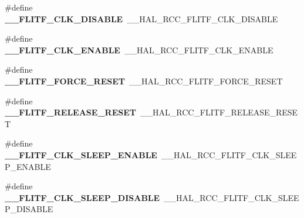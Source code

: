 \begin{DoxyCompactItemize}
\item 
\#define {\bfseries \+\_\+\+\_\+\+F\+L\+I\+T\+F\+\_\+\+C\+L\+K\+\_\+\+D\+I\+S\+A\+B\+LE}~\+\_\+\+\_\+\+H\+A\+L\+\_\+\+R\+C\+C\+\_\+\+F\+L\+I\+T\+F\+\_\+\+C\+L\+K\+\_\+\+D\+I\+S\+A\+B\+LE\hypertarget{group___h_a_l___r_c_c___aliased_ga12f4502b35811f253e6a23d42a048b82}{}\label{group___h_a_l___r_c_c___aliased_ga12f4502b35811f253e6a23d42a048b82}

\item 
\#define {\bfseries \+\_\+\+\_\+\+F\+L\+I\+T\+F\+\_\+\+C\+L\+K\+\_\+\+E\+N\+A\+B\+LE}~\+\_\+\+\_\+\+H\+A\+L\+\_\+\+R\+C\+C\+\_\+\+F\+L\+I\+T\+F\+\_\+\+C\+L\+K\+\_\+\+E\+N\+A\+B\+LE\hypertarget{group___h_a_l___r_c_c___aliased_ga18ea2573c2441635fb10ae66bd5babf2}{}\label{group___h_a_l___r_c_c___aliased_ga18ea2573c2441635fb10ae66bd5babf2}

\item 
\#define {\bfseries \+\_\+\+\_\+\+F\+L\+I\+T\+F\+\_\+\+F\+O\+R\+C\+E\+\_\+\+R\+E\+S\+ET}~\+\_\+\+\_\+\+H\+A\+L\+\_\+\+R\+C\+C\+\_\+\+F\+L\+I\+T\+F\+\_\+\+F\+O\+R\+C\+E\+\_\+\+R\+E\+S\+ET\hypertarget{group___h_a_l___r_c_c___aliased_gaabbf02ca51ae6a097a2c0b12cb99c4a5}{}\label{group___h_a_l___r_c_c___aliased_gaabbf02ca51ae6a097a2c0b12cb99c4a5}

\item 
\#define {\bfseries \+\_\+\+\_\+\+F\+L\+I\+T\+F\+\_\+\+R\+E\+L\+E\+A\+S\+E\+\_\+\+R\+E\+S\+ET}~\+\_\+\+\_\+\+H\+A\+L\+\_\+\+R\+C\+C\+\_\+\+F\+L\+I\+T\+F\+\_\+\+R\+E\+L\+E\+A\+S\+E\+\_\+\+R\+E\+S\+ET\hypertarget{group___h_a_l___r_c_c___aliased_ga0c5dc3f1f18b878e7e9d6448e603218c}{}\label{group___h_a_l___r_c_c___aliased_ga0c5dc3f1f18b878e7e9d6448e603218c}

\item 
\#define {\bfseries \+\_\+\+\_\+\+F\+L\+I\+T\+F\+\_\+\+C\+L\+K\+\_\+\+S\+L\+E\+E\+P\+\_\+\+E\+N\+A\+B\+LE}~\+\_\+\+\_\+\+H\+A\+L\+\_\+\+R\+C\+C\+\_\+\+F\+L\+I\+T\+F\+\_\+\+C\+L\+K\+\_\+\+S\+L\+E\+E\+P\+\_\+\+E\+N\+A\+B\+LE\hypertarget{group___h_a_l___r_c_c___aliased_ga6babe617d7f79bed0316d570ad6f6abe}{}\label{group___h_a_l___r_c_c___aliased_ga6babe617d7f79bed0316d570ad6f6abe}

\item 
\#define {\bfseries \+\_\+\+\_\+\+F\+L\+I\+T\+F\+\_\+\+C\+L\+K\+\_\+\+S\+L\+E\+E\+P\+\_\+\+D\+I\+S\+A\+B\+LE}~\+\_\+\+\_\+\+H\+A\+L\+\_\+\+R\+C\+C\+\_\+\+F\+L\+I\+T\+F\+\_\+\+C\+L\+K\+\_\+\+S\+L\+E\+E\+P\+\_\+\+D\+I\+S\+A\+B\+LE\hypertarget{group___h_a_l___r_c_c___aliased_ga3611eb96ece8835c54951f96d980ae95}{}\label{group___h_a_l___r_c_c___aliased_ga3611eb96ece8835c54951f96d980ae95}


\end{DoxyCompactItemize}
